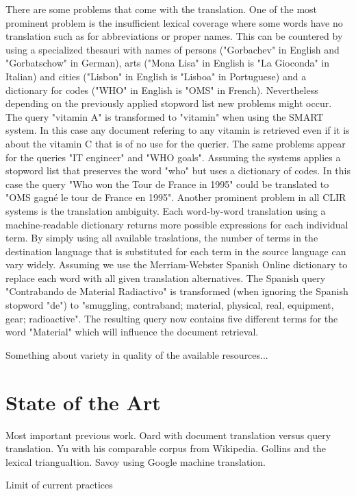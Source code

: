 \documentclass[journal]{IEEEtran}
\begin{document}
There are some problems that come with the translation.
One of the most prominent problem is the insufficient lexical coverage where some words have no translation such as for abbreviations or proper names.
This can be countered by using a specialized thesauri with names of persons ("Gorbachev" in English and "Gorbatschow" in German), arts ("Mona Lisa" in English is "La Gioconda" in Italian) and cities ("Lisbon" in English is "Lisboa" in Portuguese) and a dictionary for codes ("WHO" in English is "OMS" in French).
Nevertheless depending on the previously applied stopword list new problems might occur.
The query "vitamin A" is transformed to "vitamin" when using the SMART system.
In this case any document refering to any vitamin is retrieved even if it is about the vitamin C that is of no use for the querier.
The same problems appear for the queries "IT engineer" and "WHO goals".
Assuming the systems applies a stopword list that preserves the word "who" but uses a dictionary of codes.
In this case the query "Who won the Tour de France in 1995" could be translated to "OMS gagn\'{e} le tour de France en 1995".
Another prominent problem in all CLIR systems is the translation ambiguity.
Each word-by-word translation using a machine-readable dictionary returns more possible expressions for each individual term.
By simply using all available traslations, the number of terms in the destination language that is substituted for each term in the source language can vary widely.
Assuming we use the Merriam-Webster Spanish Online dictionary to replace each word with all given translation alternatives.
The Spanish query "Contrabando de Material Radiactivo" is transformed (when ignoring the Spanish stopword "de") to "smuggling, contraband; material, physical, real, equipment, gear; radioactive".
The resulting query now contains five different terms for the word "Material" which will influence the document retrieval.

Something about variety in quality of the available resources...


\section{State of the Art}

Most important previous work.
Oard with document translation versus query translation.
Yu with his comparable corpus from Wikipedia.
Gollins and the lexical triangualtion.
Savoy using Google machine translation.

Limit of current practices
\end{document}
